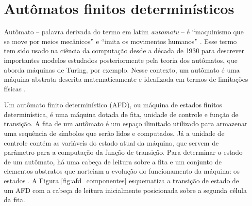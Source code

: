 \section{Autômatos finitos determinísticos}
\label{sec:afd}

Autômato -- palavra derivada do termo em latim \textit{automatu} -- é ``maquinismo que se move por meios mecânicos'' e ``imita os movimentos humanos'' \cite[p. 81]{aurelio}. Esse termo tem sido usado na ciência da computação desde a década de 1930 para descrever importantes modelos estudados posteriormente pela teoria dos autômatos, que aborda máquinas de Turing, por exemplo. Nesse contexto, um autômato é uma máquina abstrata descrita matematicamente e idealizada em termos de limitações físicas \cite{hopcroft}.

Um autômato finito determinístico (\acs{AFD}), ou máquina de estados finitos determinística, é uma máquina dotada de fita, unidade de controle e função de transição. A fita de um autômato é um espaço ilimitado utilizado para armazenar uma sequência de símbolos que serão lidos e computados. Já a unidade de controle contém as variáveis do estado atual da máquina, que servem de parâmetro para a computação da função de transição. Para determinar o estado de um autômato, há uma cabeça de leitura sobre a fita e um conjunto de elementos abstratos que norteiam a evolução do funcionamento da máquina: os estados \cite{hopcroft, menezes}. A Figura \ref{fig:afd_componentes} esquematiza a transição de estado de um AFD com a cabeça de leitura inicialmente posicionada sobre a segunda célula da fita.


